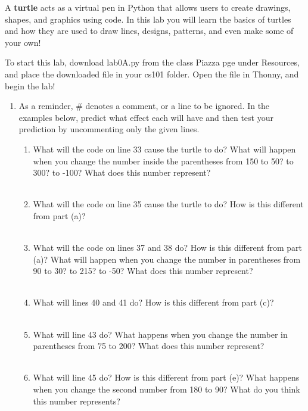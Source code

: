 \documentclass[11pt, letterpaper, onecolumn, oneside, final]{article}
\begin{document}
\maketitle
A \textbf{turtle} acts as a virtual pen in Python that allows users to create drawings, shapes, and graphics using code. In this lab you will learn the basics of turtles and how they are used to draw lines, designs, patterns, and even make some of your own! 

To start this lab, download {\consolas lab0A.py} from the class Piazza pge under Resources, and place the downloaded file in your {\consolas cs101} folder. Open the file in Thonny, and begin the lab!

\begin{enumerate}
\item As a reminder, {\consolas \#} denotes a comment, or a line to be ignored. In the examples below, predict what effect each will have and then test your prediction by uncommenting only the given lines. 
\begin{enumerate}
    \item What will the code on line 33 cause the turtle to do? What will happen when you change the number inside the parentheses from 150 to 50? to 300? to -100? What does this number represent?\\
    \\
    \item What will the code on line 35 cause the turtle to do? How is this different from part (a)?\\
    \\
    \item What will the code on lines 37 and 38 do? How is this different from part (a)? What will happen when you change the number in parentheses from 90 to 30? to 215? to -50? What does this number represent?\\
    \\
    \item What will lines 40 and 41 do? How is this different from part (c)?\\
    \\
    \item What will line 43 do? What happens when you change the number in parentheses from 75 to 200? What does this number represent?\\
    \\
    \item What will line 45 do? How is this different from part (e)? What happens when you change the second number from 180 to 90? What do you think this number represents?\\

\end{enumerate}
\end{enumerate}
\end{document}
